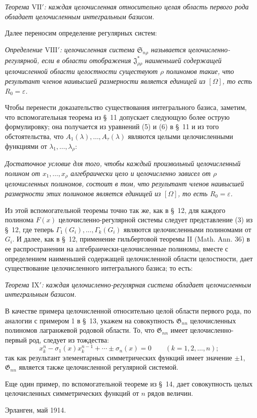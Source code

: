 \documentclass[11pt]{article}
\providecommand{\Ssys}{\mathfrak{S}}
\providecommand{\Jdom}{\mathfrak{J}}
\providecommand{\Gdom}{\mathfrak{G}}
\providecommand{\eps}{\varepsilon}
\begin{document}
\emph{Теорема $\mathrm{VII}'$: каждая целочисленная относительно целая область первого рода обладает целочисленным интегральным базисом.}

Далее переносим определение регулярных систем:

\emph{Определение $\mathrm{VIII}'$: целочисленная система $\Ssys_{n\rho}$ называется целочисленно-регулярной, если в области отображения $\Jdom^*_{\rho\rho}$ наименьшей содержащей целочисленной области целостности существуют $\rho$ полиномов такие, что результант членов наивысшей размерности является единицей из $[\Omega]$, то есть $R_0=\eps$.}

Чтобы перенести доказательство существования интегрального базиса, заметим, что вспомогательная теорема из \S\ 11 допускает следующую более острую формулировку; она получается из уравнений (5) и (6) в \S\ 11 и из того обстоятельства, что $A_1(\lambda),\ldots,A_\tau(\lambda)$ являются целыми целочисленными функциями от $\lambda_1,\ldots,\lambda_\rho$:

\emph{Достаточное условие для того, чтобы каждый произвольный целочисленный полином от $x_1,\ldots,x_\rho$ алгебраически цело и целочисленно зависел от $\rho$ целочисленных полиномов, состоит в том, что результант членов наивысшей размерности этих полиномов является единицей из $[\Omega]$, то есть $R_0=\eps$.}

Из этой вспомогательной теоремы точно так же, как в \S\ 12, для каждого полинома $F(x)$ целочисленно-регулярной системы следует представление (3) из \S\ 12, где теперь $\Gamma_1(G_i),\ldots,\Gamma_k(G_i)$ являются целочисленными полиномами от $G_i$. И далее, как в \S\ 12, применение гильбертовой теоремы II (Math. Ann. 36) в ее распространении на алгебраически-целочисленные полиномы, вместе с определением наименьшей содержащей целочисленной области целостности, дает существование целочисленного интегрального базиса; то есть:

\emph{Теорема $\mathrm{IX}'$: каждая целочисленно-регулярная система обладает целочисленным интегральным базисом.}

В качестве примера целочисленной относительно целой области первого рода, по аналогии с примером 1 в \S\ 13, укажем на совокупность $\Gdom_{nn}$ целочисленных полиномов лагранжевой родовой области. То, что $\Gdom_{nn}$ имеет целочисленно-первый род, следует из тождества:
\[
  x_k^n-\sigma_1(x)x_k^{n-1}+\cdots\pm\sigma_n(x)=0
  \qquad(k=1,2,\ldots,n);
\]
так как результант элементарных симметрических функций имеет значение $\pm1$, $\Gdom_{nn}$ является также целочисленной регулярной системой.

Еще один пример, по вспомогательной теореме из \S\ 14, дает совокупность целых целочисленных симметрических функций от $n$ рядов величин.

Эрланген, май 1914.
\end{document}
